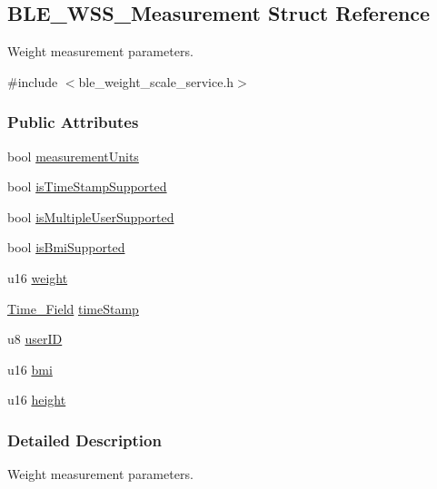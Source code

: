 \hypertarget{struct_b_l_e___w_s_s___measurement}{}\subsection{B\+L\+E\+\_\+\+W\+S\+S\+\_\+\+Measurement Struct Reference}
\label{struct_b_l_e___w_s_s___measurement}


Weight measurement parameters.  




{\ttfamily \#include $<$ble\+\_\+weight\+\_\+scale\+\_\+service.\+h$>$}

\subsubsection*{Public Attributes}
\begin{DoxyCompactItemize}
\item 
bool \hyperlink{struct_b_l_e___w_s_s___measurement_a76a6d2a1e7261ce9365656c0dc32a144}{measurement\+Units}
\item 
bool \hyperlink{struct_b_l_e___w_s_s___measurement_a623ec6e009deb26bece7a1714e798b12}{is\+Time\+Stamp\+Supported}
\item 
bool \hyperlink{struct_b_l_e___w_s_s___measurement_af3c179bfde9600ad12d29f6d8d8eeaad}{is\+Multiple\+User\+Supported}
\item 
bool \hyperlink{struct_b_l_e___w_s_s___measurement_a7497fb996528c91419f22771e84a0f03}{is\+Bmi\+Supported}
\item 
u16 \hyperlink{struct_b_l_e___w_s_s___measurement_ab804dc1b47b508623f56656793e24780}{weight}
\item 
\hyperlink{struct_time___field}{Time\+\_\+\+Field} \hyperlink{struct_b_l_e___w_s_s___measurement_a8eeabf937e8e6136c48895cb4c2fa774}{time\+Stamp}
\item 
u8 \hyperlink{struct_b_l_e___w_s_s___measurement_a468883c1999326218ce09f9538049276}{user\+ID}
\item 
u16 \hyperlink{struct_b_l_e___w_s_s___measurement_abc2373517ba72617717dc96e778d7c51}{bmi}
\item 
u16 \hyperlink{struct_b_l_e___w_s_s___measurement_a7bc999fc2a4b6e79cd301514ec0a1a20}{height}
\end{DoxyCompactItemize}


\subsubsection{Detailed Description}
Weight measurement parameters. 

